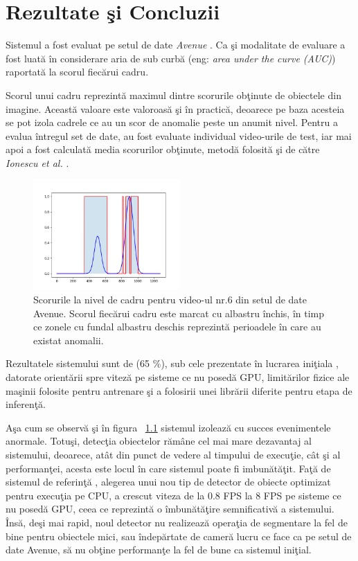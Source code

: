 \documentclass[a4paper,12pt]{report}
\begin{document}
\chapter {Rezultate şi Concluzii}

\quad Sistemul a fost evaluat pe setul de date \emph{Avenue} . Ca şi modalitate de evaluare a fost luată în considerare aria de sub curbă (eng: \emph {area under the curve (AUC)}) raportată la scorul fiecărui cadru. 
\par Scorul unui cadru reprezintă maximul dintre scorurile obţinute de obiectele din imagine. Această valoare este valoroasă şi în practică, deoarece pe baza acesteia se pot izola cadrele ce au un scor de anomalie peste un anumit nivel. Pentru a evalua întregul set de date, au fost evaluate individual video-urile de test, iar mai apoi a fost calculată media scorurilor obţinute, metodă folosită şi de către  \emph{Ionescu et al.} \cite{ionescu2019object}.
\par 
\begin{figure}
\begin{center}
        \includegraphics[width = 0.5\textwidth]{images/rezultate_video_6}
			 \caption{Scorurile la nivel de cadru pentru video-ul nr.6 din setul de date Avenue. Scorul fiecărui cadru este marcat cu albastru închis, în timp ce zonele cu fundal albastru deschis reprezintă perioadele în care au existat anomalii.}
			 \label{fig:results_6}
\end{center}
\end{figure}
\quad Rezultatele sistemului sunt de (65 \%), sub cele prezentate în lucrarea iniţiala  \cite{ionescu2019object}, datorate orientării spre viteză pe sisteme ce nu posedă GPU, limitărilor fizice ale maşinii folosite pentru antrenare şi a folosirii unei librării diferite pentru etapa de inferenţă.
\par Aşa cum se observă şi în figura ~\ref{fig:results_6} sistemul izolează cu succes evenimentele anormale. Totuşi, detecţia obiectelor rămâne cel mai mare dezavantaj al sistemului, deoarece, atât din punct de vedere al timpului de execuţie, cât şi al performanţei, acesta este locul în care sistemul poate fi imbunătăţit. Faţă de sistemul de referinţă  \cite{ionescu2019object}, alegerea unui nou tip de detector de obiecte optimizat pentru execuţia pe CPU, a crescut viteza de la 0.8 FPS la 8 FPS pe sisteme ce nu posedă GPU, ceea ce reprezintă o îmbunătăţire semnificativă a sistemului. Însă, deşi mai rapid, noul detector nu realizează operaţia de segmentare la fel de bine pentru obiectele mici, sau îndepărtate de cameră lucru ce face ca pe setul de date Avenue, să nu obţine performanţe la fel de bune ca sistemul iniţial. 
\end{document}
